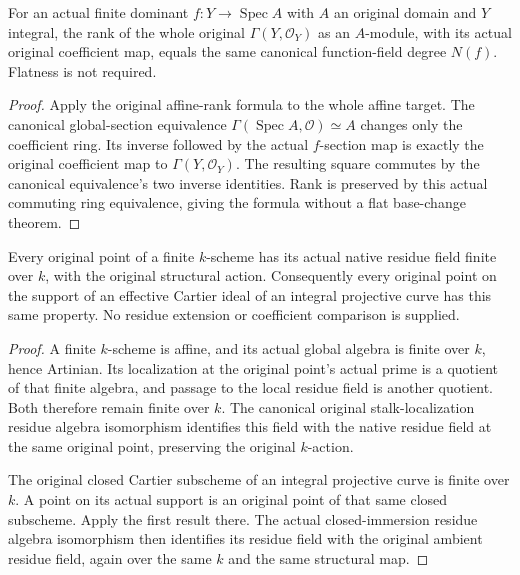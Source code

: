 \begin{theorem}
\label{thm:intrinsic-numerical-cartier-affine-coefficient-rank}
\leanok
For an actual finite dominant $f:Y\to\operatorname{Spec}A$ with $A$
an original domain and $Y$ integral, the rank of the whole original
$\Gamma(Y,\mathcal O_Y)$ as an $A$-module, with its actual original
coefficient map, equals the same canonical function-field degree
$N(f)$. Flatness is not required.
\end{theorem}
\begin{proof}
Apply the original affine-rank formula to the whole affine target. The
canonical global-section equivalence
$\Gamma(\operatorname{Spec}A,\mathcal O)\simeq A$ changes only the
coefficient ring. Its inverse followed by the actual $f$-section map is
exactly the original coefficient map to $\Gamma(Y,\mathcal O_Y)$.
The resulting square commutes by the canonical equivalence's two
inverse identities. Rank is preserved by this actual commuting ring
equivalence, giving the formula without a flat base-change theorem.
\end{proof}

\begin{theorem}
\label{thm:intrinsic-numerical-cartier-support-residue-finite}
\leanok
Every original point of a finite $k$-scheme has its actual native
residue field finite over $k$, with the original structural action.
Consequently every original point on the support of an effective
Cartier ideal of an integral projective curve has this same property.
No residue extension or coefficient comparison is supplied.
\end{theorem}
\begin{proof}
A finite $k$-scheme is affine, and its actual global algebra is finite
over $k$, hence Artinian. Its localization at the original point's
actual prime is a quotient of that finite algebra, and passage to the
local residue field is another quotient. Both therefore remain finite
over $k$. The canonical original stalk-localization residue algebra
isomorphism identifies this field with the native residue field at
the same original point, preserving the original $k$-action.

The original closed Cartier subscheme of an integral projective curve
is finite over $k$. A point on its actual support is an original point
of that same closed subscheme. Apply the first result there. The
actual closed-immersion residue algebra isomorphism then identifies
its residue field with the original ambient residue field, again over
the same $k$ and the same structural map.
\end{proof}

